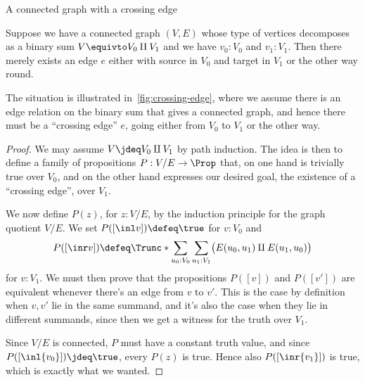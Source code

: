 \begin{marginfigure}
  \caption{A connected graph with a crossing edge}
  \label{fig:crossing-edge}
\end{marginfigure}
\begin{lemma}\label{lem:crossing-edge}
  Suppose we have a connected graph $(V,E)$ whose type of vertices
  decomposes as a binary sum $V \equivto V_0 \amalg V_1$
  and we have $v_0:V_0$ and $v_1:V_1$.
  Then there merely exists an edge $e$ either with source in $V_0$ and target in $V_1$
  or the other way round.
\end{lemma}
The situation is illustrated in~\cref{fig:crossing-edge}, where we assume
there is an edge relation on the binary sum that gives a connected graph,
and hence there must be a ``crossing edge'' $e$, going either from $V_0$ to $V_1$
or the other way.
\begin{proof}
  We may assume $V \jdeq V_0 \amalg V_1$ by path induction.
  The idea is then to define a family of propositions $P : V/E \to \Prop$
  that, on one hand is trivially true over $V_0$, and on the other hand
  expresses our desired goal, the existence of a ``crossing edge'', over $V_1$.

  We now define $P(z)$, for $z:V/E$,
  by the induction principle for the graph quotient $V/E$.
  We set $P([\inl v]) \defeq \true$ for $v : V_0$ and
  \[
    P([\inr v]) \defeq \Trunc*{\sum_{u_0:V_0}\sum_{u_1:V_1}
      \bigl(E(u_0,u_1) \amalg E(u_1,u_0)\bigr)}
  \]
  for $v : V_1$.
  We must then prove that the propositions $P([v])$ and $P([v'])$ are equivalent
  whenever there's an edge from $v$ to $v'$.
  This is the case by definition when $v,v'$ lie in the same summand,
  and it's also the case when they lie in different summands, since then
  we get a witness for the truth over $V_1$.

  Since $V/E$ is connected, $P$ must have a constant truth value,
  and since $P([\inl{v_0}])\jdeq\true$, every $P(z)$ is true.
  Hence also $P([\inr{v_1}])$ is true, which is exactly what we wanted.
\end{proof}

